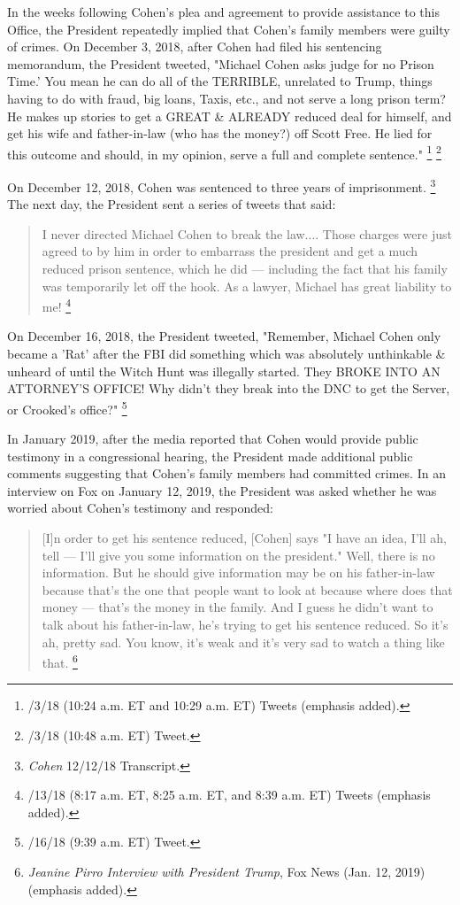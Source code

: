 {In the weeks following Cohen's plea and agreement to provide assistance to this Office, the President repeatedly implied that Cohen's family members were guilty of crimes.
On December 3, 2018, after Cohen had filed his sentencing memorandum, the President tweeted, "Michael Cohen asks judge for no Prison Time.'
You mean he can do all of the TERRIBLE, unrelated to Trump, things having to do with fraud, big loans, Taxis, etc., and not serve a long prison term?
He makes up stories to get a GREAT \& ALREADY reduced deal for himself, and get his wife and father-in-law (who has the money?) off Scott Free.
He lied for this outcome and should, in my opinion, serve a full and complete sentence."%
\footnote{/3/18 (10:24 a.m. ET and 10:29 a.m. ET) Tweets (emphasis added).}
\footnote{/3/18 (10:48 a.m. ET) Tweet.}

On December 12, 2018, Cohen was sentenced to three years of imprisonment.%
\footnote{\textit{Cohen} 12/12/18 Transcript.}
The next day, the President sent a series of tweets that said:

\begin{quote}
I never directed Michael Cohen to break the law....
Those charges were just agreed to by him in order to embarrass the president and get a much reduced prison sentence, which he did — including the fact that his family was temporarily let off the hook.
As a lawyer, Michael has great liability to me!%
\footnote{/13/18 (8:17 a.m. ET, 8:25 a.m. ET, and 8:39 a.m. ET) Tweets (emphasis added).}
\end{quote}

On December 16, 2018, the President tweeted, "Remember, Michael Cohen only became a 'Rat' after the FBI did something which was absolutely unthinkable \& unheard of until the Witch Hunt was illegally started.
They BROKE INTO AN ATTORNEY'S OFFICE!
Why didn't they break into the DNC to get the Server, or Crooked's office?"%
\footnote{/16/18 (9:39 a.m. ET) Tweet.}

In January 2019, after the media reported that Cohen would provide public testimony in a congressional hearing, the President made additional public comments suggesting that Cohen's family members had committed crimes.
In an interview on Fox on January 12, 2019, the President was asked whether he was worried about Cohen's testimony and responded:

\begin{quote}
[I]n order to get his sentence reduced, [Cohen] says "I have an idea, I'll ah, tell — I'll give you some information on the president."
Well, there is no information.
But he should give information may be on his father-in-law because that's the one that people want to look at because where does that money — that's the money in the family.
And I guess he didn't want to talk about his father-in-law, he's trying to get his sentence reduced.
So it's ah, pretty sad.
You know, it's weak and it's very sad to watch a thing like that.%
\footnote{\textit{Jeanine Pirro Interview with President Trump}, Fox News (Jan. 12, 2019) (emphasis added).}
\end{quote}

}

